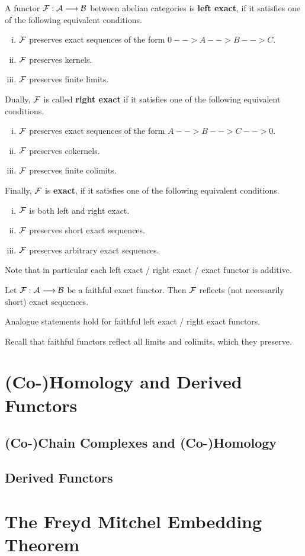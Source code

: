 	\begin{definition}
		A functor $\mathcal{F}: \mathcal{A} --> \mathcal{B}$ between abelian categories is \textbf{left exact}, if it satisfies one of the following equivalent conditions.
		\begin{enumerate}[(i)]
			\item{
				$\mathcal{F}$ preserves exact sequences of the form $0 --> A --> B --> C$.
			}
			\item{
				$\mathcal{F}$ preserves kernels.
			}
			\item{
				$\mathcal{F}$ preserves finite limits.
			}
		\end{enumerate}

		Dually, $\mathcal{F}$ is called \textbf{right exact} if it satisfies one of the following equivalent conditions.
		\begin{enumerate}[(i)]
			\item{
				$\mathcal{F}$ preserves exact sequences of the form $A --> B --> C --> 0$.
			}
			\item{
				$\mathcal{F}$ preserves cokernels.
			}
			\item{
				$\mathcal{F}$ preserves finite colimits.
			}
		\end{enumerate}

		Finally, $\mathcal{F}$ is \textbf{exact}, if it satisfies one of the following equivalent conditions.
		\begin{enumerate}[(i)]
			\item{
				$\mathcal{F}$ is both left and right exact.
			}
			\item{
				$\mathcal{F}$ preserves short exact sequences.
			}
			\item{
				$\mathcal{F}$ preserves arbitrary exact sequences.
			}
		\end{enumerate}

		Note that in particular each left exact / right exact / exact functor is additive.
	\end{definition}

	\begin{lemma}
		Let $\mathcal{F}: \mathcal{A} --> \mathcal{B}$ be a faithful exact functor. Then $\mathcal{F}$ reflects (not necessarily short) exact sequences.

		Analogue statements hold for faithful left exact / right exact functors.
	\end{lemma}
	\begin{sketch}
		Recall that faithful functors reflect all limits and colimits, which they preserve.
	\end{sketch}

	\newpage
	\section{(Co-)Homology and Derived Functors}
	\subsection{(Co-)Chain Complexes and (Co-)Homology}
	\subsection{Derived Functors}

	\newpage
	\section{The Freyd Mitchel Embedding Theorem}

